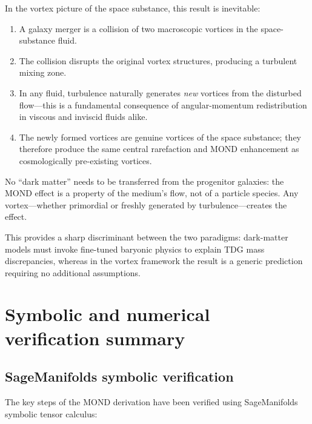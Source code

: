 \documentclass[11pt]{article}
\begin{document}
In the vortex picture of the space substance, this result is
inevitable:
\begin{enumerate}
  \item A galaxy merger is a collision of two macroscopic
    vortices in the space-substance fluid.
  \item The collision disrupts the original vortex structures,
    producing a turbulent mixing zone.
  \item In any fluid, turbulence naturally generates
    \emph{new} vortices from the disturbed flow---this is a
    fundamental consequence of angular-momentum redistribution
    in viscous and inviscid fluids alike.
  \item The newly formed vortices are genuine vortices of the
    space substance; they therefore produce the same central
    rarefaction and MOND enhancement as cosmologically
    pre-existing vortices.
\end{enumerate}

No ``dark matter'' needs to be transferred from the progenitor
galaxies: the MOND effect is a property of the medium's flow,
not of a particle species.  Any vortex---whether primordial or
freshly generated by turbulence---creates the effect.

This provides a sharp discriminant between the two paradigms:
dark-matter models must invoke fine-tuned baryonic physics to
explain TDG mass discrepancies, whereas in the vortex
framework the result is a generic prediction requiring no
additional assumptions.

\section{Symbolic and numerical verification summary}\label{sec:verification_summary}

\subsection{SageManifolds symbolic verification}

The key steps of the MOND derivation have been verified using SageManifolds symbolic tensor calculus:
\end{document}

